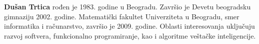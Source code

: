 \documentclass[12pt,oneside]{memoir}
\begin{document}
\literatura

\backmatter

\begin{biografija}
\textbf{Dušan Trtica} rođen je 1983. godine u Beogradu. Završio je
Devetu beogradsku gimnaziju 2002. godine. Matematički fakultet
Univerziteta u Beogradu, smer informatika i računarstvo, završio je
2009. godine. Oblasti interesovanja uključuju razvoj softvera,
funkcionalno programiranje, kao i algoritme veštačke inteligencije.
\end{biografija}
\end{document}
